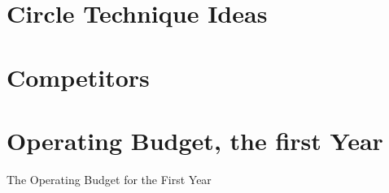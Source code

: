 

\begin{appendices}
  \renewcommand\thetable{\thesection}
  \renewcommand\thefigure{\thesection}

	\section{Circle Technique Ideas} \label{app:circ}
		
		\newpage
	
	\section{Competitors} \label{app:comp}
		

	\section{Operating Budget, the first Year}  \label{tab:bud:oper:fy} 
		\begin{table}[H]
		\centering
		\caption{The Operating Budget for the First Year}
		    
		\end{table}

\end{appendices}

